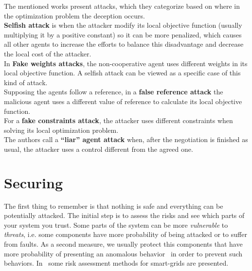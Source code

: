 \documentclass[../main.tex]{subfiles}
\begin{document}
The mentioned works present \fdi{} attacks, which they categorize based on where in the optimization problem the deception occurs.
\\\textbf{Selfish attack} is when the attacker modify its local objective function (usually multiplying it by a positive constant) so it can be more penalized, which causes all other agents to increase the efforts to balance this disadvantage and decrease the local cost of the attacker.
\\In \textbf{Fake weights attacks}, the non-cooperative agent uses different weights in its local objective function. A selfish attack can be viewed as a specific case of this kind of attack.
\\Supposing the agents follow a reference, in a \textbf{false reference attack} the malicious agent uses a different value of reference to calculate its local objective function.
\\For a \textbf{fake constraints attack}, the attacker uses different constraints when solving its local optimization problem.
\\The authors call a \textbf{``liar'' agent attack} when, after the negotiation is finished as usual, the attacker uses a control different from the agreed one.

\section{Securing \cps{}}\label{sec:maintaining_security}
The first thing to remember is that nothing is safe and everything can be potentially attacked.
The initial step is to assess the risks and see which parts of your system you trust.
Some parts of the system can be more \emph{vulnerable} to \emph{threats}, i.e. some components have more probability of being attacked or to suffer from faults.
As a second measure, we usually protect this components that have more probability of presenting an anomalous behavior~\cite{Bishop2005} in order to prevent such behaviors.
In~\cite{WangLu2013} some risk assessment methods for smart-grids are presented.
\end{document}
